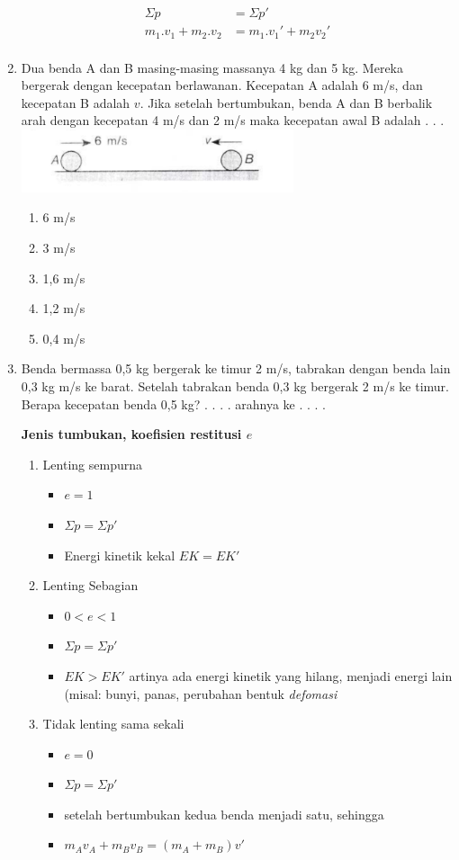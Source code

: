 \documentclass[10pt,a4paper]{extarticle}
\newcommand*\daftar[1]{
\begin{itemize}[label=$\bullet$, itemsep=0pt,topsep=0pt,leftmargin=*] #1 
\end{itemize}}
\newcommand{\pilgani}[1]{                            \vspace{-0.3cm}\begin{multicols}{2}
 \begin{enumerate}[label=\Alph*., itemsep=0pt,topsep=0pt,leftmargin=*,align=Center]#1                     \end{enumerate}
 \phantom{ini cuma sapi, wedus, dan ayam}
 \end{multicols}}
\begin{document}
\begin{multicols*}{2}
\begin{enumerate}
\begin{align*}
\Sigma p &= \Sigma p'\\
m_1.v_1 + m_2.v_2 &= m_1.v_1' +m_2v_2'\\
\end{align*}

\item Dua benda A dan B masing-masing massanya 4 kg dan 5 kg. Mereka bergerak dengan kecepatan berlawanan. Kecepatan A adalah 6 m/s, dan kecepatan B adalah $v$. Jika setelah bertumbukan, benda A dan B berbalik arah dengan kecepatan 4 m/s dan 2 m/s maka kecepatan awal B adalah . . . 
\includegraphics[width=8cm]{pic/mom1}
\pilgani{
        \item 6 m/s
        \item 3 m/s
        \item 1,6 m/s
        \item 1,2 m/s
        \item 0,4 m/s
        }
\vspace{2cm}

\item Benda bermassa 0,5 kg bergerak ke timur 2 m/s, tabrakan dengan benda lain 0,3 kg m/s ke barat. Setelah tabrakan benda 0,3 kg bergerak 2 m/s ke timur. Berapa kecepatan benda 0,5 kg? . . . . arahnya ke . . . .
\vspace{2cm}


\textbf{Jenis tumbukan, koefisien restitusi $e$}
        \begin{enumerate}
\item Lenting sempurna
     \daftar{
        \item $e =1 $
        \item $\Sigma p = \Sigma p' $
        \item Energi kinetik kekal $EK=EK'$
        }

 \item Lenting Sebagian
        \daftar{
        \item $0<e<1$
        \item $\Sigma p = \Sigma p'$
        \item $EK> EK'$ artinya ada energi kinetik yang hilang, menjadi energi lain (misal: bunyi, panas, perubahan bentuk \textit{defomasi}}

 \item Tidak lenting sama sekali
        \daftar{
        \item $e=0$
        \item $\Sigma p = \Sigma p'$
        \item setelah bertumbukan kedua benda menjadi satu, sehingga 
        \item $m_Av_A + m_Bv_B = (m_A + m_B)v'$
        }
        \end{enumerate}


\end{enumerate}
\end{multicols*}
\end{document}
